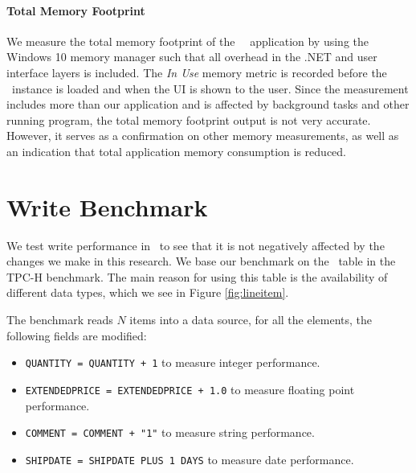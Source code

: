 \paragraph{Total Memory Footprint}
\label{par:Total Memory Footprint}

We measure the total memory footprint of the \tpchdl~\gd~application by using the Windows 10 memory manager such that all overhead in the .NET and user interface layers is included. The \textit{In Use} memory metric is recorded before the \gd~instance is loaded and when the UI is shown to the user. Since the measurement includes more than our application and is affected by background tasks and other running program, the total memory footprint output is not very accurate. However, it serves as a confirmation on other memory measurements, as well as an indication that total application memory consumption is reduced.

\section{Write Benchmark}
\label{bm:write}


We test write performance in \gap~to see that it is not negatively affected by the changes we make in this research. We base our benchmark on the \lineitem~table in the TPC-H benchmark. The main reason for using this table is the availability of different data types, which we see in Figure \ref{fig:lineitem}.

The benchmark reads $N$ items into a data source, for all the elements, the following fields are modified:
\begin{itemize}
    \item \texttt{QUANTITY = QUANTITY + 1} to measure integer performance.
    \item \texttt{EXTENDEDPRICE = EXTENDEDPRICE + 1.0} to measure floating point performance.
    \item \texttt{COMMENT = COMMENT + "1"} to measure string performance.
    \item \texttt{SHIPDATE = SHIPDATE PLUS 1 DAYS} to measure date performance.
\end{itemize}


